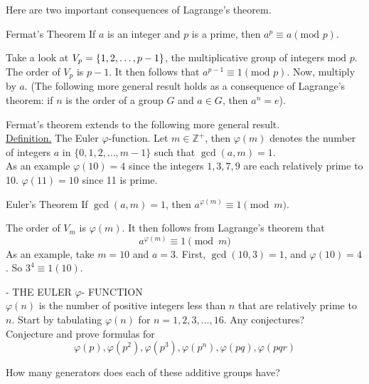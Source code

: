 \documentclass[12pt]{book}
\theoremstyle{definition}
\def\Z{\mathbb{Z}}
\begin{document}
Here are two important consequences of Lagrange's theorem.\\[.2in]
\begin{tctheorem}{Fermat's Theorem}{}
If $ a $ is an integer and $ p $ is a prime, then $ a^p \equiv a(\text{mod } p) $.
\end{tctheorem}
\begin{newproof}
Take a look at $ V_p=\{1,2,\text{\dots},p-1\} $, the multiplicative group of integers $ \text{mod } p. $ The order of $ V_p $ is $ p-1 $. It then follows that $ a^{p-1}\equiv 1 (\text{mod } p) $. Now, multiply by $a$. (The following more general result holds as a consequence of Lagrange's theorem: if $ n $ is the order of a group $ G $ and $ a\in G $, then $ a^n=e $).
\end{newproof}
Fermat's theorem extends to the following more general result.\\[.2in] 
\underline{Definition.} The Euler $ \varphi $-function. Let $ m\in \Z^+ $, then $ \varphi(m) $ denotes the number of integers $ a $ in $\{0,1,2,\dots,  m-1 \}$ such that $ \gcd(a,m)=1. $\\[.2in]
As an example $ \varphi(10)=4 $ since the integers $ 1,3,7,9 $ are each relatively prime to 10. $ \varphi(11)=10 $ since 11 is prime.\\[.2in]
\begin{tctheorem}{Euler's Theorem}{}
If $ \gcd(a,m)=1 $, then $ a^{\varphi(m)}\equiv 1\pmod m $.
\end{tctheorem}
\begin{newproof}
The order of $ V_m $ is $ \varphi(m) $. It then follows from Lagrange's theorem that
$$a^{\varphi(m)}\equiv1\pmod m $$
As an example, take $ m=10 $ and $ a=3 $. First, $ \gcd(10,3)=1 $, and $ \varphi(10)=4 $. So $ 3^4\equiv 1(10). $
\end{newproof}

\clearpage
{} - THE EULER $ \varphi $- FUNCTION \\[.2in]
$ \varphi(n) $ is the number of positive integers less than $ n $ that are relatively prime to $ n $. Start by tabulating $ \varphi(n) $ for $ n=1,2,3,\dots, 16 $. Any conjectures?\\

Conjecture and prove formulas for 
$$ \varphi(p),\varphi(p^2),\varphi(p^3),\varphi(p^n),\varphi(pq), \varphi(pqr) $$

How many generators does each of these additive groups have?
\end{document}
